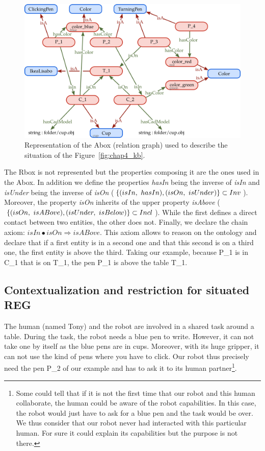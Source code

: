 \begin{figure}[h!]
\centering
\includegraphics[scale=0.38]{figures/chapter4/pens_Abox.png}
\caption{\label{fig:chap4_kb_Abox} Representation of the Abox (relation graph) used to describe the situation of the Figure~\ref{fig:chap4_kb}. }
\end{figure}

The Rbox is not represented but the properties composing it are the ones used in the Abox. In addition we define the properties \textit{hasIn} being the inverse of \textit{isIn} and \textit{isUnder} being the inverse of \textit{isOn} ($\{(isIn,\ hasIn), (isOn,\ isUnder)\} \subset \invset$). Moreover, the property \textit{isOn} inherits of the upper property \textit{isAbove} ($\{(isOn,\ isABove), (isUnder,\ isBelow)\} \subset Incl$). While the first defines a direct contact between two entities, the other does not. Finally, we declare the chain axiom: $isIn \bullet isOn \Rightarrow isABove$. This axiom allows to reason on the ontology and declare that if a first entity is in a second one and that this second is on a third one, the first entity is above the third. Taking our example, because P\_1 is in C\_1 that is on T\_1, the pen P\_1 is above the table T\_1.

\subsection{Contextualization and restriction for situated REG}

The human (named Tony) and the robot are involved in a shared task around a table. During the task, the robot needs a blue pen to write. However, it can not take one by itself as the blue pens are in cups. Moreover, with its huge gripper, it can not use the kind of pens where you have to click. Our robot thus precisely need the pen P\_2 of our example and has to ask it to its human partner\footnote{Some could tell that if it is not the first time that our robot and this human collaborate, the human could be aware of the robot capabilities. In this case, the robot would just have to ask for a blue pen and the task would be over. We thus consider that our robot never had interacted with this particular human. For sure it could explain its capabilities but the purpose is not there.}.

